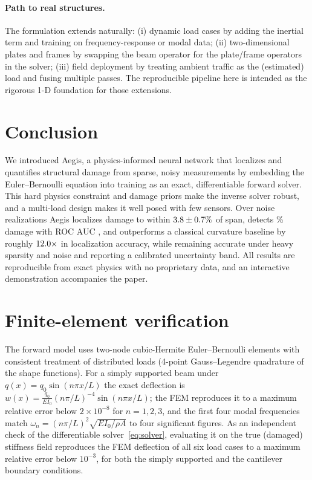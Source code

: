 \documentclass[11pt]{article}
\newcommand{\EI}{\mathit{EI}}
\begin{document}
\paragraph{Path to real structures.} The formulation extends naturally:
(i) dynamic load cases by adding the inertial term and training on
frequency-response or modal data; (ii) two-dimensional plates and frames by
swapping the beam operator for the plate/frame operators in the solver;
(iii) field deployment by treating ambient traffic as the (estimated) load and
fusing multiple passes. The reproducible pipeline here is intended as the rigorous
1-D foundation for those extensions.

\section{Conclusion}
We introduced Aegis, a physics-informed neural network that localizes and
quantifies structural damage from sparse, noisy measurements by embedding the
Euler--Bernoulli equation into training as an exact, differentiable forward solver.
This hard physics constraint and damage priors make the inverse solver robust, and
a multi-load design makes it well posed with few sensors. Over \nseeds{} noise
realizations Aegis localizes damage to within $3.8\pm0.7\%$ of span,
detects \sevbig\% damage with ROC AUC \aucbig, and outperforms a classical curvature
baseline by roughly $12.0\times$ in localization accuracy, while remaining
accurate under heavy sparsity and noise and reporting a calibrated uncertainty band.
All results are reproducible from exact physics with no proprietary data, and an
interactive demonstration accompanies the paper.

\appendix
\section{Finite-element verification}\label{app:fem}
The forward model uses two-node cubic-Hermite Euler--Bernoulli elements with
consistent treatment of distributed loads (4-point Gauss--Legendre quadrature of
the shape functions). For a simply supported beam under $q(x)=q_0\sin(n\pi x/L)$
the exact deflection is $w(x)=\frac{q_0}{\EI_0}(n\pi/L)^{-4}\sin(n\pi x/L)$; the
FEM reproduces it to a maximum relative error below $2\times 10^{-8}$ for
$n=1,2,3$, and the first four modal frequencies match
$\omega_n=(n\pi/L)^2\sqrt{\EI_0/\rho A}$ to four significant figures. As an
independent check of the differentiable solver~\eqref{eq:solver}, evaluating it on
the true (damaged) stiffness field reproduces the FEM deflection of all six load
cases to a maximum relative error below $10^{-3}$, for both the simply supported
and the cantilever boundary conditions.
\end{document}
